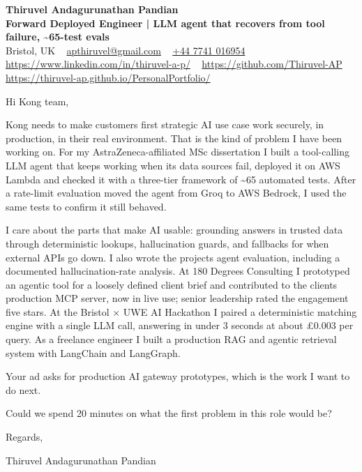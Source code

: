 \documentclass[11pt,a4paper]{article}
\begin{document}
\raggedright
\pagestyle{empty}

\begin{center}
    {\LARGE \color{linkblue} \textbf{Thiruvel Andagurunathan Pandian}}\\[0.2cm]
    {\color{headernavy}\small\textbf{Forward Deployed Engineer | LLM agent that recovers from tool failure, \textasciitilde{}65-test evals}}\\[0.2cm]
    {\small Bristol, UK\nobreak\ \,\textbar\, \href{mailto:apthiruvel@gmail.com}{apthiruvel@gmail.com}\nobreak\ \,\textbar\, \href{tel:+447741016954}{+44 7741 016954}\nobreak\ \,\textbar\, \href{https://www.linkedin.com/in/thiruvel-a-p/}{https://www.linkedin.com/in/thiruvel-a-p/}\nobreak\ \,\textbar\, \href{https://github.com/Thiruvel-AP}{https://github.com/Thiruvel-AP}\nobreak\ \,\textbar\, \href{https://thiruvel-ap.github.io/PersonalPortfolio/}{https://thiruvel-ap.github.io/PersonalPortfolio/}}

\end{center}

\vspace{0.4cm}

\noindent
Hi Kong team,

Kong needs to make customers\textquotesingle{} first strategic AI use case work securely, in production, in their real environment. That is the kind of problem I have been working on. For my AstraZeneca-affiliated MSc dissertation I built a tool-calling LLM agent that keeps working when its data sources fail, deployed it on AWS Lambda and checked it with a three-tier framework of \textasciitilde{}65 automated tests. After a rate-limit evaluation moved the agent from Groq to AWS Bedrock, I used the same tests to confirm it still behaved.

I care about the parts that make AI usable: grounding answers in trusted data through deterministic lookups, hallucination guards, and fallbacks for when external APIs go down. I also wrote the project\textquotesingle{}s agent evaluation, including a documented hallucination-rate analysis. At 180 Degrees Consulting I prototyped an agentic tool for a loosely defined client brief and contributed to the client\textquotesingle{}s production MCP server, now in live use; senior leadership rated the engagement five stars. At the Bristol × UWE AI Hackathon I paired a deterministic matching engine with a single LLM call, answering in under 3 seconds at about £0.003 per query. As a freelance engineer I built a production RAG and agentic retrieval system with LangChain and LangGraph.

Your ad asks for production AI gateway prototypes, which is the work I want to do next.

Could we spend 20 minutes on what the first problem in this role would be?

\vspace{0.5cm}

Regards,

Thiruvel Andagurunathan Pandian
\end{document}
